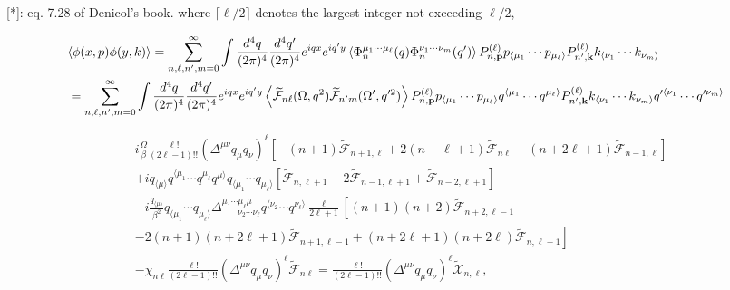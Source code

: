 \documentclass[aps,prd,preprint,nofootinbib,amsmath,amssymb,showpacs,longbibliography,singlecolumn,superscriptaddress,10pt]{revtex4-1}
\theoremstyle{plain}
\theoremstyle{definition}
\begin{document}
[*]: eq. 7.28 of Denicol's book. where $\lceil \ell / 2 \rceil$ denotes the largest integer not exceeding $\ell / 2$,

\begin{equation}
\begin{aligned}
&\langle \phi(x,p) \phi(y,k)  \rangle 
=
\sum_{n,\ell, n',m = 0}^{\infty}
\int \frac{d^{4}q}{(2 \pi)^{4}}  \frac{d^{4}q'}{(2 \pi)^{4}} e^{iqx} e^{iq'y} \left\langle \Phi_{n}^{\mu_{1} \cdots \mu_{\ell}}(q) \Phi_{n}^{\nu_{1} \cdots \nu_{m}}(q') \right\rangle P_{n,{\bf p}}^{(\ell)} p_{\langle \mu_{1}} \cdots p_{ \mu_{\ell} \rangle}
P_{n',{\bf k}}^{(\ell)} k_{\langle \nu_{1}} \cdots k_{ \nu_{m} \rangle}
\\
&
=
\sum_{n,\ell, n',m = 0}^{\infty}
\int \frac{d^{4}q}{(2 \pi)^{4}}  \frac{d^{4}q'}{(2 \pi)^{4}} e^{iqx} e^{iq'y} \left\langle \widetilde{\mathcal{F}}_{n\ell}(\Omega, q^{2})
\widetilde{\mathcal{F}}_{n'm}(\Omega', q'^{2})\right\rangle P_{n,{\bf p}}^{(\ell)} p_{\langle \mu_{1}} \cdots p_{ \mu_{\ell} \rangle} q^{\langle \mu_{1}} \cdots q^{\mu_{\ell} \rangle}
P_{n',{\bf k}}^{(\ell)} k_{\langle \nu_{1}} \cdots k_{ \nu_{m} \rangle} q'^{\langle \nu_{1}} \cdots q'^{\nu_{m} \rangle}
\end{aligned}    
\end{equation}




\begin{equation}
\begin{aligned}
&
i \frac{\Omega}{\beta} \frac{\ell!}{(2 \ell - 1)!!}\left(\Delta^{\mu \nu} q_{\mu} q_{\nu}\right)^{\ell} \left[
-(n+1) 
\widetilde{\mathcal{F}}_{n+1,\ell}+
2(n+\ell+1)
\widetilde{\mathcal{F}}_{n\ell}
-
(n+2\ell+1)
\widetilde{\mathcal{F}}_{n-1,\ell}
\right]
\\
&
+ 
i q_{\langle \mu \rangle} q^{\langle \mu_{1}} \cdots q^{\mu_{\ell}} q^{\mu \rangle} q_{\langle \mu_{1}} \cdots q_{\mu_{\ell} \rangle} \left[ \widetilde{\mathcal{F}}_{n,\ell+1}
-
2 \widetilde{\mathcal{F}}_{n-1,\ell+1}
+
\widetilde{\mathcal{F}}_{n-2,\ell+1}
\right]
\\
&
-
i \frac{q_{\langle \mu \rangle}}{\beta^{2}}  
q_{\langle \mu_{1}} \cdots q_{\mu_{\ell} \rangle}\Delta^{\mu_{1} \cdots \mu_{\ell} \mu}_{ \ \ \ \ \ \ \ \ \nu_{2} \cdots \nu_{\ell}} 
q^{\langle \nu_{2}} \cdots q^{\nu_{\ell} \rangle}
 \frac{\ell}{2 \ell + 1}
\left[
(n+1)(n+2)
\widetilde{\mathcal{F}}_{n+2,\ell-1}
\right.
\\
&
\left.
-
2(n+1)(n+2\ell+1)
\widetilde{\mathcal{F}}_{n+1,\ell-1}
+
(n+2\ell+1)(n+2\ell)
\widetilde{\mathcal{F}}_{n,\ell-1}
\right]
\\
&
-
\chi_{n\ell}
\frac{\ell!}{(2 \ell - 1)!!}\left(\Delta^{\mu \nu} q_{\mu} q_{\nu}\right)^{\ell} \widetilde{\mathcal{F}}_{n\ell}
   = 
\frac{\ell!}{(2 \ell - 1)!!}\left(\Delta^{\mu \nu} q_{\mu} q_{\nu}\right)^{\ell}   
\widetilde{\mathcal{X}}_{n,\ell}
,
\end{aligned}
\end{equation}
\end{document}
